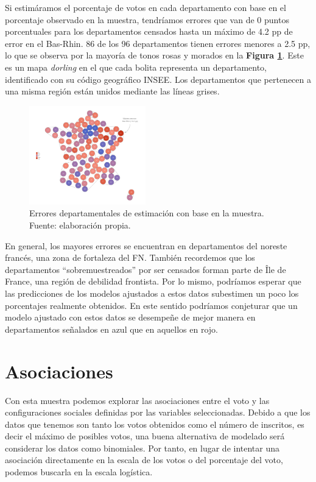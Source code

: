 Si estimáramos el porcentaje de votos en cada departamento con base en el porcentaje observado en la muestra, tendríamos errores que van de 0 puntos porcentuales para los departamentos censados hasta un máximo de 4.2 pp de error en el Bas-Rhin. 86 de los 96 departamentos tienen errores menores a 2.5 pp, lo que se observa por la mayoría de tonos rosas y morados en la \textbf{Figura \ref{fig:Errores_Est_Muestra}}. Este es un mapa \textit{dorling} en el que cada bolita representa un departamento, identificado con su código geográfico INSEE. Los departamentos que pertenecen a una misma región están unidos mediante las líneas grises.\\ 

\begin{figure}[h]
	\centering
	\includegraphics[width = 0.45\textwidth]{Figs/AED/Dorling_Errores_P12_FN_MUESTRA}
	\caption{Errores departamentales de estimación con base en la muestra. Fuente: elaboración propia.}
	\label{fig:Errores_Est_Muestra}	
\end{figure}

En general, los mayores errores se encuentran en departamentos del noreste francés, una zona de fortaleza del FN. También recordemos que los departamentos ``sobremuestreados'' por ser censados forman parte de Île de France, una región de debilidad frontista. Por lo mismo, podríamos esperar que las predicciones de los modelos ajustados a estos datos subestimen un poco los porcentajes realmente obtenidos. En este sentido podríamos conjeturar que un modelo ajustado con estos datos se desempeñe de mejor manera en departamentos señalados en azul que en aquellos en rojo. 

\section{Asociaciones}

Con esta muestra podemos explorar las asociaciones entre el voto y las configuraciones sociales definidas por las variables seleccionadas. Debido a que los datos que tenemos son tanto los votos obtenidos como el número de inscritos, es decir el máximo de posibles votos, una buena alternativa de modelado será considerar los datos como binomiales. Por tanto, en lugar de intentar una asociación directamente en la escala de los votos o del porcentaje del voto, podemos buscarla en la escala logística.\\

